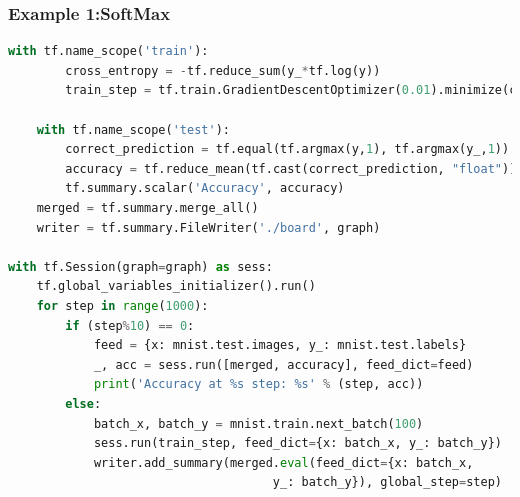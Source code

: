 \begin{frame}[fragile]
  \MyLogo
  \frametitle{Example 1:SoftMax}  
\ContinueLineNumber
\scriptsize{
\begin{lstlisting}[language=python]
	with tf.name_scope('train'):
		cross_entropy = -tf.reduce_sum(y_*tf.log(y))
		train_step = tf.train.GradientDescentOptimizer(0.01).minimize(cross_entropy)

	with tf.name_scope('test'):
		correct_prediction = tf.equal(tf.argmax(y,1), tf.argmax(y_,1))
		accuracy = tf.reduce_mean(tf.cast(correct_prediction, "float"))
		tf.summary.scalar('Accuracy', accuracy)
	merged = tf.summary.merge_all()
	writer = tf.summary.FileWriter('./board', graph)
	
with tf.Session(graph=graph) as sess:
	tf.global_variables_initializer().run()
	for step in range(1000):
		if (step%10) == 0:
			feed = {x: mnist.test.images, y_: mnist.test.labels}
			_, acc = sess.run([merged, accuracy], feed_dict=feed)
			print('Accuracy at %s step: %s' % (step, acc))
		else:
			batch_x, batch_y = mnist.train.next_batch(100)
			sess.run(train_step, feed_dict={x: batch_x, y_: batch_y})
			writer.add_summary(merged.eval(feed_dict={x: batch_x,
									 y_: batch_y}), global_step=step)
\end{lstlisting}
}


\end{frame}
